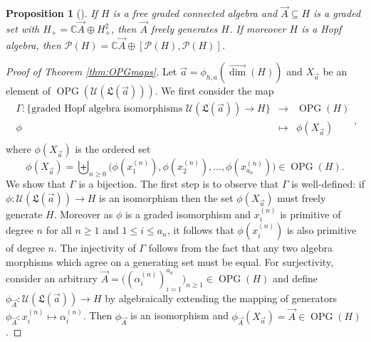 \documentclass[11pt]{amsart}
\newtheorem{proposition}[theorem]{Proposition}
\theoremstyle{definition}
\numberwithin{equation}{section}
\def\CC{{\mathbb C}}
\newcommand{\vecdim}{\overrightarrow{\dim}}
\newcommand{\OPG}{\operatorname{OPG}}
\begin{document}
\begin{proposition}[{\cite[Proposition 2.2 and 2.4]{F23}}]
\label{prop:indecomposable generators}
If $H$ is a free graded connected algebra and $\vec{A} \subseteq H$ is a graded set with $H_{+} = \CC \vec{A} \oplus H_{+}^{2}$, then $\vec{A}$ freely generates $H$.  If moreover $H$ is a Hopf algebra, then $\mathcal{P}(H) = \CC \vec{A} \oplus [\mathcal{P}(H), \mathcal{P}(H)]$.
\end{proposition}

\begin{proof}[Proof of Theorem \ref{thm:OPGmaps}]
Let $\vec{a} = \phi_{h,a}(\vecdim(H))$ and $X_{\vec{a}}$ be an element of $\OPG(\mathcal{U}(\mathfrak{L}(\vec{a})))$.
We first consider the map 
\[
\begin{array}{rcl}
\Gamma: \{\text{graded Hopf algebra isomorphisms $\mathcal{U}(\mathfrak{L}(\vec{a})) \to H$}\} &\to& \OPG(H) \\
\phi & \mapsto & \phi(X_{\vec{a}}) \\
\end{array},
\]
where $\phi(X_{\vec{a}})$ is the  ordered set
\[
\phi(X_{\vec{a}}) = \biguplus_{n \ge 0} \big( \phi(x_{1}^{(n)}), \phi(x_{2}^{(n)}), \ldots, \phi(x_{a_{n}}^{(n)}) \big) \in \OPG(H).
\]
We show that $\Gamma$ is a bijection.  The first step is to observe that $\Gamma$
is well-defined: if $\phi: \mathcal{U}(\mathfrak{L}(\vec{a})) \to H$
is an isomorphism then the set $\phi(X_{\vec{a}})$ must freely generate $H$.
Moreover as $\phi$ is a graded isomorphism and $x_{i}^{(n)}$ is primitive
of degree $n$ for all $n \ge 1$ and $1 \le i \le a_{n}$, it follows that
$\phi(x_{i}^{(n)})$ is also primitive of degree $n$.
The injectivity of $\Gamma$ follows from the fact that any two algebra
morphisms which agree on a generating set must be equal.
For surjectivity, consider an arbitrary
$\vec{A} = \big((\alpha_{i}^{(n)})_{i=1}^{a_{n}}\big)_{n \ge 1} \in \OPG(H)$
and define $\phi_{\vec{A}}:\mathcal{U}(\mathfrak{L}(\vec{a})) \to H$ by
algebraically extending the mapping of generators $\phi_{\vec{A}}: x_{i}^{(n)} \mapsto \alpha_i^{(n)}$.
Then $\phi_{\vec{A}}$ is an isomorphism and $\phi_{\vec{A}}(X_{\vec{a}}) = \vec{A} \in \OPG(H)$.


\end{proof}
\end{document}
